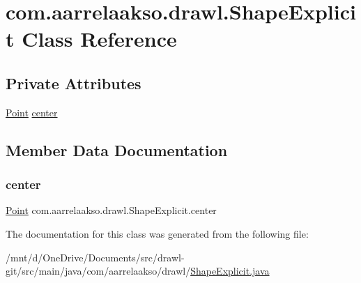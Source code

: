\hypertarget{classcom_1_1aarrelaakso_1_1drawl_1_1_shape_explicit}{}\section{com.\+aarrelaakso.\+drawl.\+Shape\+Explicit Class Reference}
\label{classcom_1_1aarrelaakso_1_1drawl_1_1_shape_explicit}
\subsection*{Private Attributes}
\begin{DoxyCompactItemize}
\item 
\hyperlink{classcom_1_1aarrelaakso_1_1drawl_1_1_point}{Point} \hyperlink{classcom_1_1aarrelaakso_1_1drawl_1_1_shape_explicit_aecea9209d9d5d5803acd7ff7b8ec9642}{center}
\end{DoxyCompactItemize}


\subsection{Member Data Documentation}
\mbox{\label{classcom_1_1aarrelaakso_1_1drawl_1_1_shape_explicit_aecea9209d9d5d5803acd7ff7b8ec9642}} 
\subsubsection{\texorpdfstring{center}{center}}
{\footnotesize\ttfamily \hyperlink{classcom_1_1aarrelaakso_1_1drawl_1_1_point}{Point} com.\+aarrelaakso.\+drawl.\+Shape\+Explicit.\+center\hspace{0.3cm}{\ttfamily [private]}}



The documentation for this class was generated from the following file\+:\begin{DoxyCompactItemize}
\item 
/mnt/d/\+One\+Drive/\+Documents/src/drawl-\/git/src/main/java/com/aarrelaakso/drawl/\hyperlink{_shape_explicit_8java}{Shape\+Explicit.\+java}\end{DoxyCompactItemize}
